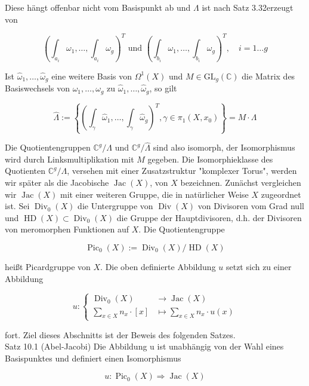 \documentclass[10pt, letterpaper]{article}
\begin{document}
Diese hängt offenbar nicht vom Basispunkt ab und $\Lambda$ ist nach Satz 3.32erzeugt von

$$
\left(\int_{a_{i}} \omega_{1}, \ldots, \int_{a_{i}} \omega_{g}\right)^{T} \text { und }\left(\int_{b_{i}} \omega_{1}, \ldots, \int_{b_{i}} \omega_{g}\right)^{T}, \quad i=1 \ldots g
$$

Ist $\widehat{\omega}_{1}, \ldots, \widehat{\omega}_{g}$ eine weitere Basis von $\Omega^{1}(X)$ und $M \in \mathrm{GL}_{g}(\mathbb{C})$ die Matrix des Basiswechsels von $\omega_{1}, \ldots, \omega_{g}$ zu $\widehat{\omega}_{1}, \ldots, \widehat{\omega}_{g}$, so gilt

$$
\widehat{\Lambda}:=\left\{\left(\int_{\gamma} \widehat{\omega}_{1}, \ldots, \int_{\gamma} \widehat{\omega}_{g}\right)^{T}, \gamma \in \pi_{1}\left(X, x_{0}\right)\right\}=M \cdot \Lambda
$$

Die Quotientengruppen $\mathbb{C}^{g} / \Lambda$ und $\mathbb{C}^{g} / \widehat{\Lambda}$ sind also isomorph, der Isomorphismus wird durch Linksmultiplikation mit $M$ gegeben. Die Isomorphieklasse des Quotienten $\mathbb{C}^{g} / \Lambda$, versehen mit einer Zusatzstruktur "komplexer Torus", werden wir später als die Jacobische $\operatorname{Jac}(X)$, von $X$ bezeichnen. Zunächst vergleichen wir $\operatorname{Jac}(X)$ mit einer weiteren Gruppe, die in natürlicher Weise $X$ zugeordnet ist. Sei $\operatorname{Div}_{0}(X)$ die Untergruppe von $\operatorname{Div}(X)$ von Divisoren vom Grad null und $\operatorname{HD}(X) \subset \operatorname{Div}_{0}(X)$ die Gruppe der Hauptdivisoren, d.h. der Divisoren von meromorphen Funktionen auf $X$. Die Quotientengruppe

$$
\operatorname{Pic}_{0}(X):=\operatorname{Div}_{0}(X) / \operatorname{HD}(X)
$$

heißt Picardgruppe von $X$. Die oben definierte Abbildung $u$ setzt sich zu einer Abbildung

$$
u:\left\{\begin{aligned}
\operatorname{Div}_{0}(X) & \longrightarrow \operatorname{Jac}(X) \\
\sum_{x \in X} n_{x} \cdot[x] & \longmapsto \sum_{x \in X} n_{x} \cdot u(x)
\end{aligned}\right.
$$

fort. Ziel dieses Abschnitts ist der Beweis des folgenden Satzes.\\
Satz 10.1 (Abel-Jacobi) Die Abbildung u ist unabhängig von der Wahl eines Basispunktes und definiert einen Isomorphismus

$$
u: \operatorname{Pic}_{0}(X) \Longrightarrow \operatorname{Jac}(X)
$$
\end{document}
